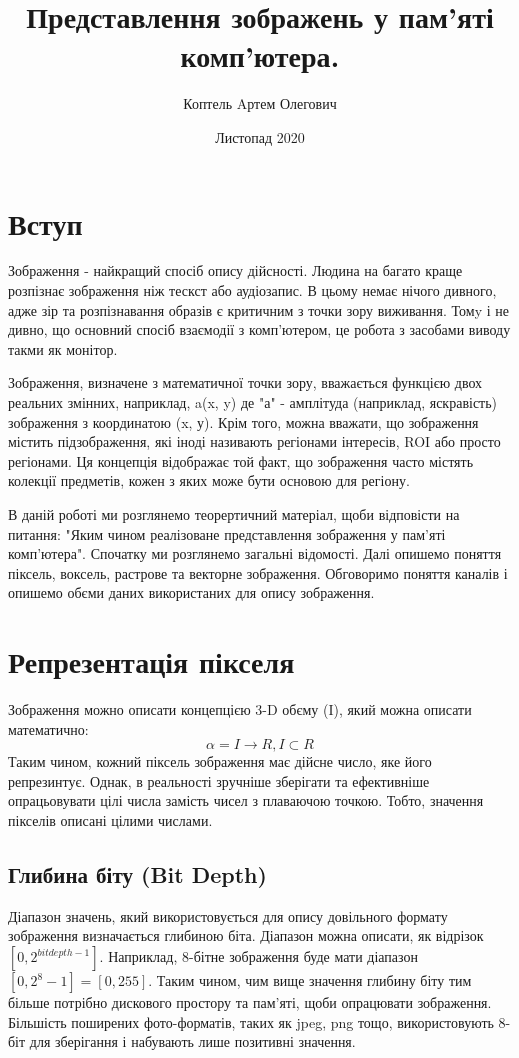 \documentclass[a4paper,12pt]{article}
\title{Представлення зображень у пам’яті комп’ютера.}
\author{Коптель Aртем Олегович}
\date{Листопад 2020}
\begin{document}
    
    \newpage

    \tableofcontents
    \newpage


    \section{Вступ}\label{sec:intr}
    Зображення - найкращий спосіб опису дійсності.
    Людина на багато краще розпізнає зображення ніж тескст або аудіозапис.
    В цьому немає нічого дивного, адже зір та розпізнавання образів є критичним з точки зору виживання.
    Томy і не дивно, що основний спосіб взаємодії з комп'ютером, це робота з засобами виводу такми як монітор.

    Зображення, визначене з математичної точки зору, вважається функцією двох реальних змінних, наприклад, a(x, y) де "а" - амплітуда (наприклад, яскравість) зображення з координатою (x, у).
    Крім того, можна вважати, що зображення містить підзображення, які іноді називають регіонами інтересів, ROI або просто регіонами.
    Ця концепція відображає той факт, що зображення часто містять колекції предметів, кожен з яких може бути основою для регіону.

    В даній роботі ми розглянемо теорертичний матеріал, щоби відповісти на питання: "Яким чином реалізоване представлення зображення у пам'яті комп'ютера".
    Спочатку ми розглянемо загальні відомості.
    Далі опишемо поняття піксель, воксель, растрове та векторне зображення.
    Обговоримо поняття каналів і опишемо обєми даних використаних для опису зображення.


    \section{Репрезентація пікселя}\label{sec:pixel_definition}
    Зображення можно описати концепцією 3-D обєму (I), який можна описати математично:
    \[ \alpha = I \rightarrow R, I \subset R \]
    Таким чином, кожний піксель зображення має дійсне число, яке його репрезинтує.
    Однак, в реальності зручніше зберігати та ефективніше опрацьовувати цілі числа замість чисел з плаваючою точкою.
    Тобто, значення пікселів описані цілими числами.

    \subsection{Глибина біту (Bit Depth)}\label{subsec:bit_depth}
    Діапазон значень, який використовується для опису довільного формату зображення визначається глибиною біта.
    Діапазон можна описати, як відрізок \([0, 2^{bitdepth - 1}]\).
    Наприклад, 8-бітне зображення буде мати діапазон \([0, 2^{8} - 1] = [0, 255]\).
    Таким чином, чим вище значення глибину біту тим більше потрібно дискового простору та пам'яті, щоби опрацювати зображення.
    Більшість поширених фото-форматів, таких як jpeg, png тощо, використовують 8-біт для зберігання і набувають лише позитивні значення.
\end{document}
